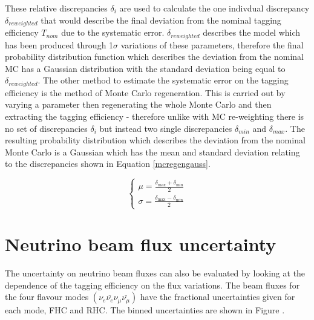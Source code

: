 \documentclass{article}
\begin{document}
These relative discrepancies $\delta_{i}$ are used to calculate the one indivdual discrepancy $\delta_{reweighted}$ that would describe the final deviation from the nominal tagging efficiency $T_{nom}$ due to the systematic error. $\delta_{reweighted}$ describes the model which has been produced through 1$\sigma$ variations of these parameters, therefore the final probability distribution function which describes the deviation from the nominal MC has a Gaussian distribution with the standard deviation being equal to $\delta_{reweighted}$. 
\newline
The other method to estimate the systematic error on the tagging efficiency is the method of Monte Carlo regeneration. This is carried out by varying a parameter then regenerating the whole Monte Carlo and then extracting the tagging efficiency - therefore unlike with MC re-weighting there is no set of discrepancies $\delta_{i}$ but instead two single discrepancies $\delta_{min}$ and $\delta_{max}$. The resulting probability distribution which describes the deviation from the nominal Monte Carlo is a Gaussian which has the mean and standard deviation relating to the discrepancies shown in Equation \eqref{mcregengauss}.
\newline

\begin{equation}
\left\{\begin{array}{l}
\mu=\frac{\delta_{\max }+\delta_{\min }}{2} \\
\sigma=\frac{\delta_{\max }-\delta_{\min }}{2}
\end{array}\right.
\label{mcregengauss}
\end{equation}


\section{Neutrino beam flux uncertainty}

The uncertainty on neutrino beam fluxes can also be evaluated by looking at the dependence of the tagging efficiency on the flux variations. The beam fluxes for the four flavour modes 
$\left(\nu_{e} \overline{\nu_{e}} \nu_{\mu} \overline{\nu_{\mu}}\right)$ have the fractional uncertainties given for each mode, FHC and RHC. The binned uncertainties are shown in Figure .
\end{document}
